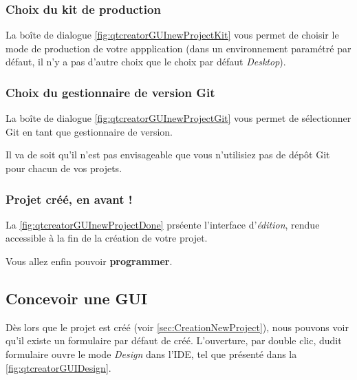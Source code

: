 \documentclass[12pt,a4paper,oneside,titlepage,final]{article}
\begin{document}

\subsubsection{Choix du kit de production}
La boîte de dialogue \figurename \vref{fig:qtcreatorGUInewProjectKit}
vous permet de choisir le mode de production de votre appplication
(dans un environnement paramétré par défaut, il n'y a pas d'autre
choix que le choix par défaut \emph{Desktop}).


\subsubsection{Choix du gestionnaire de version \gls{Git}}
La boîte de dialogue \figurename \vref{fig:qtcreatorGUInewProjectGit}
vous permet de sélectionner \gls{Git} en tant que gestionnaire de
version.

Il va de soit qu'il n'est pas envisageable que vous n'utilisiez pas de
dépôt \gls{Git} pour chacun de vos projets.


\subsubsection{Projet créé, en avant !}
La \figurename \vref{fig:qtcreatorGUInewProjectDone} prséente
l'interface d'\emph{édition}, rendue accessible à la fin de la
création de votre projet.

Vous allez enfin pouvoir \textbf{programmer}.


\subsection{Concevoir une \gls{GUI}}
\label{sec:concevoirGUI}
Dès lors que le projet est créé (voir \vref{sec:CreationNewProject}),
nous pouvons voir qu'il existe un formulaire par défaut de
créé. L'ouverture, par double clic, dudit formulaire ouvre le mode
\emph{Design} dans l'\gls{IDE}, tel que présenté dans la \figurename
\vref{fig:qtcreatorGUIDesign}.
\end{document}
